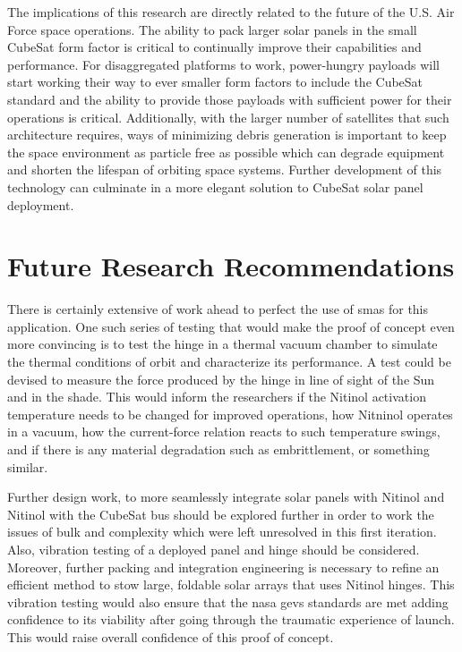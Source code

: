 The implications of this research are directly related to the future of the U.S. Air Force space operations. The ability to pack larger solar panels in the small CubeSat form factor is critical to continually improve their capabilities and performance. For disaggregated platforms to work, power-hungry payloads will start working their way to ever smaller form factors to include the CubeSat standard and the ability to provide those payloads with sufficient power for their operations is critical. Additionally, with the larger number of satellites that such architecture requires, ways of minimizing debris generation is important to keep the space environment as particle free as possible which can degrade equipment and shorten the lifespan of orbiting space systems. Further development of this technology can culminate in a more elegant solution to CubeSat solar panel deployment.     

\section{Future Research Recommendations}

There is certainly extensive of work ahead to perfect the use of \gls{sma}s for this application. One such series of testing that would make the proof of concept even more convincing is to test the hinge in a thermal vacuum chamber to simulate the thermal conditions of orbit and characterize its performance. A test could be devised to measure the force produced by the hinge in line of sight of the Sun and in the shade. This would inform the researchers if the Nitinol activation temperature needs to be changed for improved operations, how Nitninol operates in a vacuum, how the current-force relation reacts to such temperature swings, and if there is any material degradation such as embrittlement, or something similar. 

Further design work, to more seamlessly integrate solar panels with Nitinol and Nitinol with the CubeSat bus should be explored further in order to work the issues of bulk and complexity which were left unresolved in this first iteration. Also, vibration testing of a deployed panel and hinge should be considered. Moreover, further packing and integration engineering is necessary to refine an efficient method to stow large, foldable solar arrays that uses Nitinol hinges. This vibration testing would also ensure that the \gls{nasa} \gls{gevs} standards are met adding confidence to its viability after going through the traumatic experience of launch. This would raise overall confidence of this proof of concept.  

